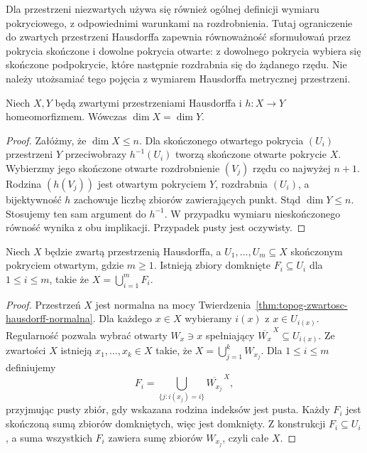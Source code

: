 \begin{uwaga}
\label{rem:topog23-normality}
Dla przestrzeni niezwartych używa się również
ogólnej definicji wymiaru pokryciowego,
z odpowiednimi warunkami na rozdrobnienia.
Tutaj ograniczenie do zwartych przestrzeni Hausdorffa
zapewnia równoważność sformułowań przez
pokrycia skończone i dowolne pokrycia otwarte:
z dowolnego pokrycia wybiera się skończone
podpokrycie, które następnie rozdrabnia się
do żądanego rzędu.
Nie należy utożsamiać tego pojęcia
z wymiarem Hausdorffa metrycznej przestrzeni.
\end{uwaga}

\begin{stwierdzenie}
\label{prop:topog23-homeomorphism}
Niech \(X,Y\) będą zwartymi przestrzeniami Hausdorffa
i \(h\colon X\to Y\) homeomorfizmem.
Wówczas \(\dim X=\dim Y\).
\end{stwierdzenie}
\begin{proof}
Załóżmy, że \(\dim X\le n\).
Dla skończonego otwartego pokrycia
\((U_i)\) przestrzeni \(Y\)
przeciwobrazy \(h^{-1}(U_i)\)
tworzą skończone otwarte pokrycie \(X\).
Wybierzmy jego skończone otwarte rozdrobnienie
\((V_j)\) rzędu co najwyżej \(n+1\).
Rodzina \((h(V_j))\) jest otwartym
pokryciem \(Y\), rozdrabnia \((U_i)\),
a bijektywność \(h\) zachowuje
liczbę zbiorów zawierających punkt.
Stąd \(\dim Y\le n\).
Stosujemy ten sam argument do \(h^{-1}\).
W przypadku wymiaru nieskończonego
równość wynika z obu implikacji.
Przypadek pusty jest oczywisty.
\end{proof}

\begin{lemat}
\label{lem:topog23-closed-shrinking}
Niech \(X\) będzie zwartą przestrzenią Hausdorffa,
a \(U_1,\ldots,U_m\subseteq X\)
skończonym pokryciem otwartym,
gdzie \(m\ge1\).
Istnieją zbiory domknięte \(F_i\subseteq U_i\)
dla \(1\le i\le m\), takie że
\(X=\bigcup_{i=1}^mF_i\).
\end{lemat}
\begin{proof}
Przestrzeń \(X\) jest normalna
na mocy Twierdzenia~\ref{thm:topog-zwartosc-hausdorff-normalna}.
Dla każdego \(x\in X\) wybieramy \(i(x)\)
z \(x\in U_{i(x)}\).
Regularność pozwala wybrać
otwarty \(W_x\ni x\) spełniający
\(\overline{W_x}^{\,X}\subseteq U_{i(x)}\).
Ze zwartości \(X\) istnieją
\(x_1,\ldots,x_k\in X\) takie, że
\(X=\bigcup_{j=1}^k W_{x_j}\).
Dla \(1\le i\le m\) definiujemy
\[
 F_i=\bigcup_{\{j:i(x_j)=i\}}
           \overline{W_{x_j}}^{\,X},
\]
przyjmując pusty zbiór, gdy wskazana rodzina
indeksów jest pusta.
Każdy \(F_i\) jest skończoną sumą
zbiorów domkniętych, więc jest domknięty.
Z konstrukcji \(F_i\subseteq U_i\),
a suma wszystkich \(F_i\) zawiera
sumę zbiorów \(W_{x_j}\), czyli całe \(X\).
\end{proof}

